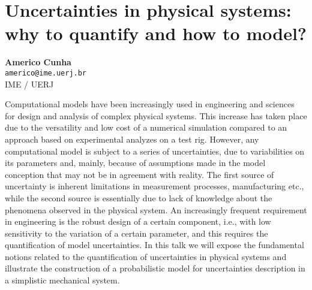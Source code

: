 
\section{Uncertainties in physical systems: why to quantify and how to model?}

\textbf{Americo Cunha}\\
\texttt{\small{americo@ime.uerj.br}}\\
IME / UERJ

Computational models have been increasingly used in engineering and sciences for design and analysis of complex physical systems. This increase has taken place due to the versatility and low cost of a numerical simulation compared to an approach based on experimental analyzes on a test rig. However, any computational model is subject to a series of uncertainties, due to variabilities on its parameters and, mainly, because of assumptions made in the model conception that may not be in agreement with reality. The first source of uncertainty is inherent limitations in measurement processes, manufacturing etc., while the second source is essentially due to lack of knowledge about the phenomena observed in the physical system.  An increasingly frequent requirement in engineering is the robust design of a certain component, i.e., with low sensitivity to the variation of a certain parameter, and this requires the quantification of model uncertainties. In this talk we will expose the fundamental notions related to the quantification of uncertainties in physical systems and illustrate the construction of a probabilistic model for uncertainties description in a simplistic mechanical system.


